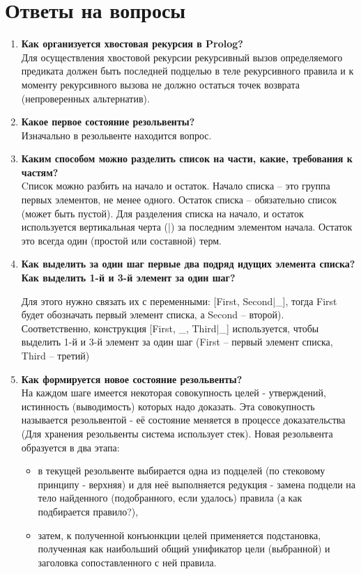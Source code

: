 \newpage
\newpage
\section*{Ответы на вопросы}
\begin{enumerate}
	\item \textbf{Как организуется хвостовая рекурсия в Prolog?}\\ 
	Для осуществления хвостовой рекурсии рекурсивный вызов определяемого предиката должен быть последней подцелью в теле рекурсивного правила и к моменту рекурсивного вызова не должно остаться точек возврата (непроверенных альтернатив).
	    
	\item \textbf{Какое первое состояние резольвенты?}\\
	Изначально в резольвенте находится вопрос.
	

    \item \textbf{Каким способом можно разделить список на части, какие, требования к частям?}\\
	Cписок можно разбить на начало и остаток. Начало списка – это группа первых элементов, не менее одного. Остаток списка – обязательно список (может быть пустой). Для разделения списка на начало, и остаток используется вертикальная черта (|) за последним элементом начала. Остаток это всегда один (простой или составной) терм. 
	
	\item \textbf{Как выделить за один шаг первые два подряд идущих элемента списка? Как выделить 1-й и 3-й элемент за один шаг?}
	
	Для этого нужно связать их с переменными: {[First, Second|\_]}, тогда First  будет обозначать первый элемент списка, а Second -- второй). \\Соответственно, конструкция {[First, \_, Third|\_]} используется, чтобы выделить 1-й и 3-й элемент за один шаг (First -- первый элемент списка, Third -- третий)

	


    \item \textbf{Как формируется новое состояние резольвенты?}\\
   	На каждом шаге имеется некоторая совокупность целей - утверждений, истинность (выводимость) которых надо доказать. Эта совокупность называется резольвентой - её состояние меняется в процессе доказательства (Для хранения резольвенты система использует стек). 
   	Новая резольвента образуется в два этапа:
   	\begin{itemize}
   		\item в текущей резольвенте выбирается одна из подцелей (по стековому принципу - верхняя) и для неё выполняется редукция - замена подцели на тело найденного (подобранного, если удалось) правила (а как подбирается правило?),
   		\item затем, к полученной конъюнкции целей применяется подстановка, полученная как наибольший общий унификатор цели (выбранной) и заголовка сопоставленного с ней правила.
   	\end{itemize}	
 

\end{enumerate}
